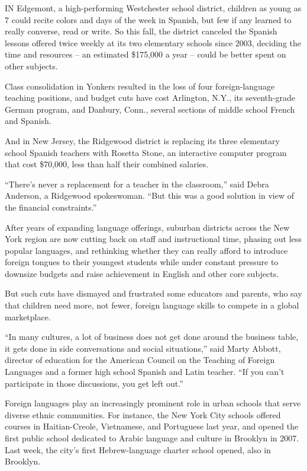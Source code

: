 ﻿\documentclass[12pt]{article}
\begin{document}
\lettrine{I}{N} Edgemont, a high-performing Westchester school district, children as young as 7
could recite colors and days of the week in Spanish, but few if any learned to really converse, read
or write. So this fall, the district canceled the Spanish lessons offered twice weekly at its two
elementary schools since 2003, deciding the time and resources -- an estimated \$175,000 a year --
could be better spent on other subjects.

Class consolidation in Yonkers resulted in the loss of four foreign-language teaching positions, and
budget cuts have cost Arlington, N.Y., its seventh-grade German program, and Danbury, Conn., several
sections of middle school French and Spanish.

And in New Jersey, the Ridgewood district is replacing its three elementary school Spanish teachers
with Rosetta Stone, an interactive computer program that cost \$70,000, less than half their
combined salaries.

``There's never a replacement for a teacher in the classroom,'' said Debra Anderson, a Ridgewood
spokeswoman. ``But this was a good solution in view of the financial constraints.''

After years of expanding language offerings, suburban districts across the New York region are now
cutting back on staff and instructional time, phasing out less popular languages, and rethinking
whether they can really afford to introduce foreign tongues to their youngest students while under
constant pressure to downsize budgets and raise achievement in English and other core subjects.

But such cuts have dismayed and frustrated some educators and parents, who say that children need
more, not fewer, foreign language skills to compete in a global marketplace.

``In many cultures, a lot of business does not get done around the business table, it gets done in
side conversations and social situations,'' said Marty Abbott, director of education for the
American Council on the Teaching of Foreign Languages and a former high school Spanish and Latin
teacher. ``If you can't participate in those discussions, you get left out.''

Foreign languages play an increasingly prominent role in urban schools that serve diverse ethnic
communities. For instance, the New York City schools offered courses in Haitian-Creole, Vietnamese,
and Portuguese last year, and opened the first public school dedicated to Arabic language and
culture in Brooklyn in 2007. Last week, the city's first Hebrew-language charter school opened, also
in Brooklyn.
\end{document}
